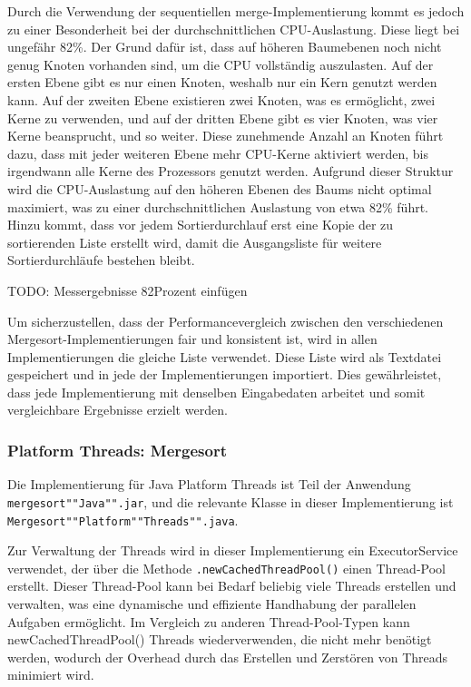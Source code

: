 \documentclass[fontsize=12pt,paper=a4,twoside=semi,parskip=half-,headsepline,headinclude]{scrreprt}
\begin{document}
Durch die Verwendung der sequentiellen merge-Implementierung kommt es jedoch zu einer Besonderheit bei der durchschnittlichen CPU-Auslastung. Diese liegt bei ungefähr 82\%. Der Grund dafür ist, dass auf höheren Baumebenen noch nicht genug Knoten vorhanden sind, um die CPU vollständig auszulasten. Auf der ersten Ebene gibt es nur einen Knoten, weshalb nur ein Kern genutzt werden kann. Auf der zweiten Ebene existieren zwei Knoten, was es ermöglicht, zwei Kerne zu verwenden, und auf der dritten Ebene gibt es vier Knoten, was vier Kerne beansprucht, und so weiter. Diese zunehmende Anzahl an Knoten führt dazu, dass mit jeder weiteren Ebene mehr CPU-Kerne aktiviert werden, bis irgendwann alle Kerne des Prozessors genutzt werden. Aufgrund dieser Struktur wird die CPU-Auslastung auf den höheren Ebenen des Baums nicht optimal maximiert, was zu einer durchschnittlichen Auslastung von etwa 82\% führt. Hinzu kommt, dass vor jedem Sortierdurchlauf erst eine Kopie der zu sortierenden Liste erstellt wird, damit die Ausgangsliste für weitere Sortierdurchläufe bestehen bleibt. 

TODO: Messergebnisse 82Prozent einfügen 

Um sicherzustellen, dass der Performancevergleich zwischen den verschiedenen Mergesort-Implementierungen fair und konsistent ist, wird in allen Implementierungen die gleiche Liste verwendet. Diese Liste wird als Textdatei  gespeichert und in jede der Implementierungen importiert. Dies gewährleistet, dass jede Implementierung mit denselben Eingabedaten arbeitet und somit vergleichbare Ergebnisse erzielt werden.

\subsubsection{Platform Threads: Mergesort}

Die Implementierung für Java Platform Threads ist Teil der Anwendung \texttt{mergesort""Java"".jar}, und die relevante Klasse in dieser Implementierung ist \texttt{Mergesort""Platform""Threads"".java}.

Zur Verwaltung der Threads wird in dieser Implementierung ein ExecutorService verwendet, der über die Methode \texttt{.newCachedThreadPool()} einen Thread-Pool erstellt. Dieser Thread-Pool kann bei Bedarf beliebig viele Threads erstellen und verwalten, was eine dynamische und effiziente Handhabung der parallelen Aufgaben ermöglicht. Im Vergleich zu anderen Thread-Pool-Typen kann newCachedThreadPool() Threads wiederverwenden, die nicht mehr benötigt werden, wodurch der Overhead durch das Erstellen und Zerstören von Threads minimiert wird.
\end{document}
